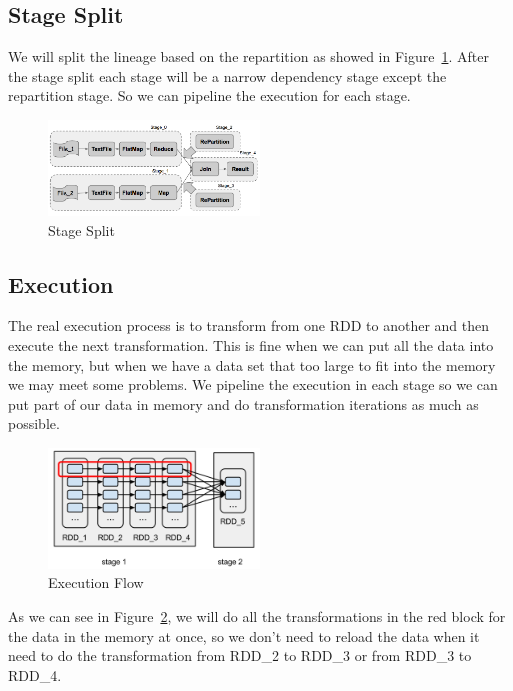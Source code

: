 \subsection{Stage Split} %
\label{sub:stage_split}
We will split the lineage based on the repartition as showed in Figure~\ref{fig:stage_split}. After the stage split each stage will be a narrow dependency stage except the repartition stage. So we can pipeline the execution for each stage.
\begin{figure}[h]
    \centering
    \includegraphics[width=0.5\textwidth]{stage_split.png}
    \caption{Stage Split}\label{fig:stage_split}
\end{figure}

\subsection{Execution} %
\label{sub:execution}
The real execution process is to transform from one RDD to another and then execute the next transformation. This is fine when we can put all the data into the memory, but when we have a data set that too large to fit into the memory we may meet some problems. We pipeline the execution in each stage so we can put part of our data in memory and do transformation iterations as much as possible.

\begin{figure}[h]
    \centering
    \includegraphics[width=0.5\textwidth]{execution_flow.png}
    \caption{Execution Flow}\label{fig:execution_flow}
\end{figure}

As we can see in Figure~\ref{fig:execution_flow}, we will do all the transformations in the red block for the data in the memory at once, so we don’t need to reload the data when it need to do the transformation from RDD\_2 to RDD\_3 or from RDD\_3 to RDD\_4.

